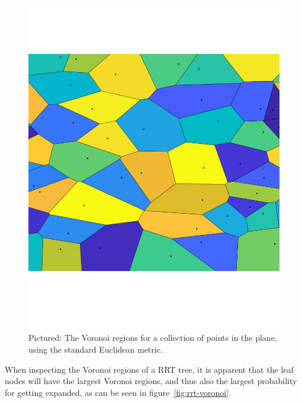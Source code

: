 \begin{figure}
  \centering
  \includegraphics[scale=.3]{figures/rrt/voronoi-diagram}
  \caption{Pictured: The Voronoi regions for a collection of points in the
    plane, using the standard Euclidean metric.}
  \label{fig:voronoi-diagram}
\end{figure}

When inspecting the Voronoi regions of a \ac{RRT} tree, it is apparent that the
leaf nodes will have the largest Voronoi regions, and thus also the largest
probability for getting expanded, as can be seen in
figure~\ref{fig:rrt-voronoi}.

